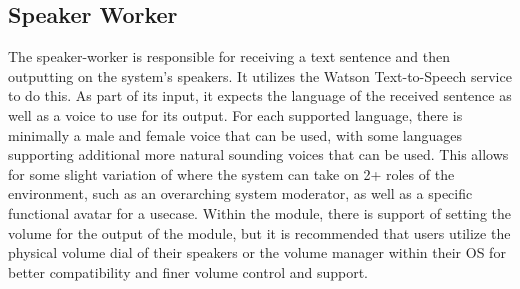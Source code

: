 \subsection{Speaker Worker}

The speaker-worker is responsible for receiving a text sentence and then outputting on the
system's speakers. It utilizes the Watson Text-to-Speech service to do this. As part of its
input, it expects the language of the received sentence as well as a voice to use for its
output. For each supported language, there is minimally a male and female voice that can
be used, with some languages supporting additional more natural sounding voices that can
be used. This allows for some slight variation of where the system can take on 2+ roles
of the environment, such as an overarching system moderator, as well as a specific
functional avatar for a usecase. Within the module, there is support of setting the volume
for the output of the module, but it is recommended that users utilize the physical volume
dial of their speakers or the volume manager within their OS for better compatibility and
finer volume control and support.
